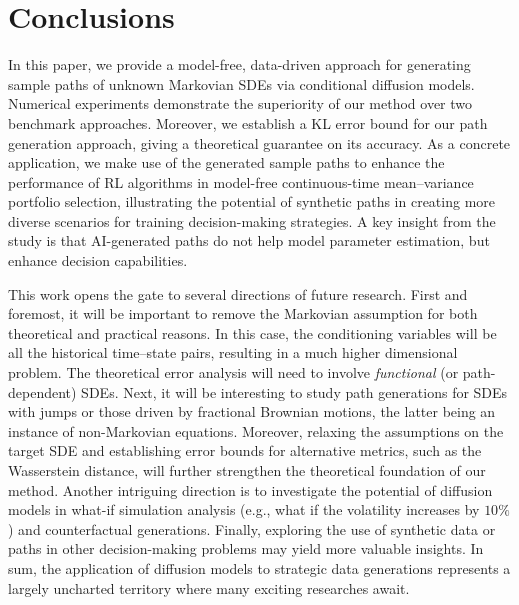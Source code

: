 \documentclass[11pt]{article}
\begin{document}

\section{Conclusions}\label{sec:conclusion}

In this paper, we provide a model-free, data-driven approach for generating sample paths of unknown Markovian SDEs via conditional diffusion models. Numerical experiments demonstrate the superiority of our method over two benchmark approaches.  Moreover, we establish a KL error bound for our path generation approach, giving a theoretical guarantee on its accuracy. As a concrete application, we make use of the generated sample paths to enhance the performance of RL algorithms in model-free continuous-time mean--variance portfolio selection, illustrating the potential of synthetic paths in creating more diverse scenarios for training decision-making strategies. A key insight from the study is that AI-generated paths do not help model parameter estimation, but enhance decision capabilities.




This work opens the gate to several directions of future research. First and foremost, it will be important to remove the Markovian assumption for both theoretical and practical reasons. In this case, the conditioning variables will be all the historical time--state pairs, resulting in a much higher dimensional problem. The theoretical error analysis will need to involve {\it functional} (or path-dependent) SDEs. Next, it will be interesting to study path generations for SDEs with jumps or those driven by fractional Brownian motions, the latter being an instance of non-Markovian equations. Moreover, relaxing the assumptions on the target SDE and establishing error bounds for alternative metrics, such as the Wasserstein distance, will further strengthen the theoretical foundation of our method. Another intriguing direction is to investigate the potential of diffusion models in what-if simulation analysis (e.g., what if the volatility increases by $10\%$) and counterfactual generations. Finally, exploring the use of synthetic data or paths in other decision-making problems may yield more valuable insights. In sum, the application of diffusion models to strategic data generations represents a largely uncharted territory where many exciting researches await.
\end{document}
